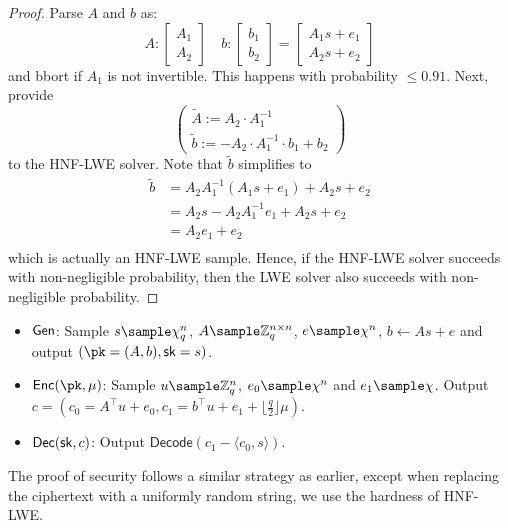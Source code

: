 \begin{lemma}
\end{lemma}
\begin{proof}
    Parse $A$ and $b$ as:
    \[A:\begin{bmatrix} A_1 \\ A_2 \end{bmatrix} \quad b:\begin{bmatrix} b_1 \\ b_2 \end{bmatrix} = \begin{bmatrix} A_1 s + e_1 \\ A_2 s + e_2 \end{bmatrix}\]
    and bbort if $A_1$ is not invertible. This happens with probability $\le 0.91$. Next, provide
    \[\begin{pmatrix} \tilde{A} := A_2 \cdot A_1^{-1} \\ \tilde{b} := -A_2 \cdot A_1^{-1} \cdot b_1 + b_2 \end{pmatrix}\] to the HNF-LWE solver. Note that $\tilde{b}$ simplifies to
    \begin{equation*}
        \begin{aligned}
            \tilde{b} & = A_2 A_1^{-1} (A_1 s + e_1) + A_2 s + e_2 \\
                      & = A_2 s - A_2 A_1^{-1} e_1 + A_2 s + e_2   \\
                      & = A_2 e_1 + e_2                            \\
        \end{aligned}
    \end{equation*}
    which is actually an HNF-LWE sample. Hence, if the HNF-LWE solver succeeds with non-negligible probability, then the LWE solver also succeeds with non-negligible probability.
\end{proof}

\begin{construction}
    \hfill
    \begin{itemize}
        \item $\mathsf{Gen}$: Sample $s \sample \chi_q^n$, $A \sample \mathbb{Z}_q^{n \times n}$, $e \sample \chi^n$, $b \gets As + e$ and output $(\pk = (A,b), \sk = s)$.
        \item $\Enc(\pk, \mu)$: Sample $u \sample \mathbb{Z}_q^n$, $e_0 \sample \chi^n$ and $e_1 \sample \chi$. Output $c = (c_0 = A^\intercal u + e_0,c_1 =  b^\intercal u + e_1 + \lfloor\frac{q}{2}\rfloor\mu)$.
        \item $\mathsf{Dec}(\mathsf{sk}, c)$: Output $\mathsf{Decode}(c_1 - \langle c_0, s\rangle)$.
    \end{itemize}
\end{construction}

The proof of security follows a similar strategy as earlier, except when replacing the ciphertext with a uniformly random string, we use the hardness of HNF-LWE.

